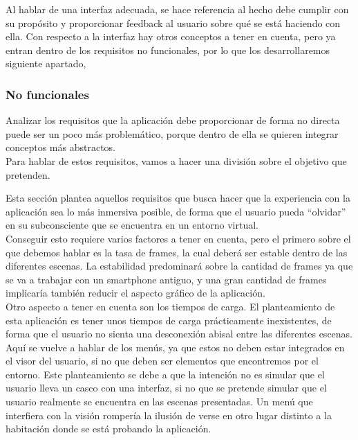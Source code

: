 \quad Al hablar de una interfaz adecuada, se hace referencia al hecho debe cumplir con su propósito y proporcionar feedback al usuario sobre qué se está haciendo con ella. Con respecto a la interfaz hay otros conceptos a tener en cuenta, pero ya entran dentro de los requisitos no funcionales, por lo que los desarrollaremos siguiente apartado,\\

\subsubsection{No funcionales}

\quad Analizar los requisitos que la aplicación debe proporcionar de forma no directa puede ser un poco más problemático, porque dentro de ella se quieren integrar conceptos más abstractos.\\
\quad Para hablar de estos requisitos, vamos a hacer una división sobre el objetivo que pretenden.


\quad Esta sección plantea aquellos requisitos que busca hacer que la experiencia con la aplicación sea lo más inmersiva posible, de forma que el usuario pueda “olvidar” en su subconsciente que se encuentra en un entorno virtual.\\

\quad Conseguir esto requiere varios factores a tener en cuenta, pero el primero sobre el que debemos hablar es la tasa de frames, la cual deberá ser estable dentro de las diferentes escenas. La estabilidad predominará sobre la cantidad de frames ya que se va a trabajar con un smartphone antiguo, y una gran cantidad de frames implicaría también reducir el aspecto gráfico de la aplicación.\\

\quad Otro aspecto a tener en cuenta son los tiempos de carga. El planteamiento de esta aplicación es tener unos tiempos de carga prácticamente inexistentes, de forma que el usuario no sienta una desconexión abisal entre las diferentes escenas.\\

\quad Aquí se vuelve a hablar de los menús, ya que estos no deben estar integrados en el visor del usuario, si no que deben ser elementos que encontremos por el entorno. Este planteamiento se debe a que la intención no es simular que el usuario lleva un casco con una interfaz, si no que se pretende simular que el usuario realmente se encuentra en las escenas presentadas. Un menú que interfiera con la visión rompería la ilusión de verse en otro lugar distinto a la habitación donde se está probando la aplicación.\\

